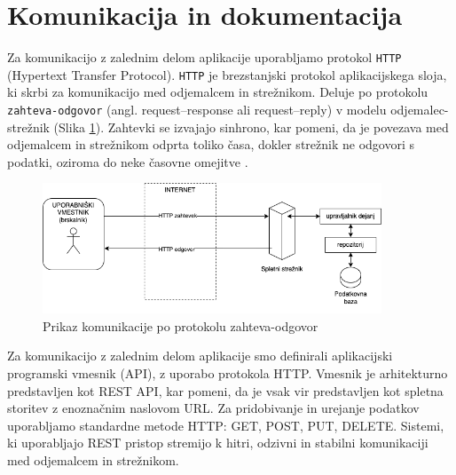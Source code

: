 \documentclass[a4paper, 12pt]{book}
\begin{document}
\section{Komunikacija in dokumentacija}
Za komunikacijo z zalednim delom aplikacije uporabljamo protokol \verb=HTTP= (Hypertext Transfer Protocol). \verb=HTTP= je brezstanjski protokol aplikacijskega sloja, ki skrbi za komunikacijo med odjemalcem in strežnikom. Deluje po protokolu \verb=zahteva-odgovor= (angl. request–response ali request–reply) v modelu odjemalec-strežnik (Slika \ref{communication-flow}). Zahtevki se izvajajo sinhrono, kar pomeni, da je povezava med odjemalcem in strežnikom odprta toliko časa, dokler strežnik ne odgovori s podatki, oziroma do neke časovne omejitve \cite{http-rfc}. 


\begin{figure}[h]
\begin{center}
\includegraphics[width=0.9\textwidth]{slike/communication.png}
\end{center}
\caption{ Prikaz komunikacije po protokolu zahteva-odgovor }
\label{communication-flow}
\end{figure}

Za komunikacijo z zalednim delom aplikacije smo definirali aplikacijski programski vmesnik (API), z uporabo protokola HTTP. Vmesnik je arhitekturno predstavljen kot REST API, kar pomeni, da je vsak vir predstavljen kot spletna storitev z enoznačnim naslovom URL. Za pridobivanje in urejanje podatkov uporabljamo standardne metode HTTP: GET, POST, PUT, DELETE. Sistemi, ki uporabljajo REST pristop stremijo k hitri, odzivni in stabilni komunikaciji med odjemalcem in strežnikom.
\end{document}

